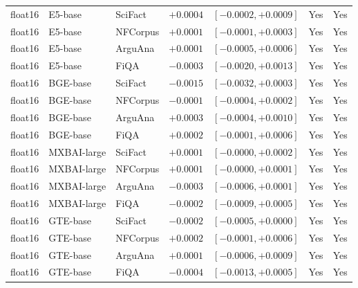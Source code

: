 \begin{table}[t]
\begin{tabular}{lllrrcc}
float16 & E5-base & SciFact & $+0.0004$ & $[-0.0002,+0.0009]$ & Yes & Yes \\
float16 & E5-base & NFCorpus & $+0.0001$ & $[-0.0001,+0.0003]$ & Yes & Yes \\
float16 & E5-base & ArguAna & $+0.0001$ & $[-0.0005,+0.0006]$ & Yes & Yes \\
float16 & E5-base & FiQA & $-0.0003$ & $[-0.0020,+0.0013]$ & Yes & Yes \\
float16 & BGE-base & SciFact & $-0.0015$ & $[-0.0032,+0.0003]$ & Yes & Yes \\
float16 & BGE-base & NFCorpus & $-0.0001$ & $[-0.0004,+0.0002]$ & Yes & Yes \\
float16 & BGE-base & ArguAna & $+0.0003$ & $[-0.0004,+0.0010]$ & Yes & Yes \\
float16 & BGE-base & FiQA & $+0.0002$ & $[-0.0001,+0.0006]$ & Yes & Yes \\
float16 & MXBAI-large & SciFact & $+0.0001$ & $[-0.0000,+0.0002]$ & Yes & Yes \\
float16 & MXBAI-large & NFCorpus & $+0.0001$ & $[-0.0000,+0.0001]$ & Yes & Yes \\
float16 & MXBAI-large & ArguAna & $-0.0003$ & $[-0.0006,+0.0001]$ & Yes & Yes \\
float16 & MXBAI-large & FiQA & $-0.0002$ & $[-0.0009,+0.0005]$ & Yes & Yes \\
float16 & GTE-base & SciFact & $-0.0002$ & $[-0.0005,+0.0000]$ & Yes & Yes \\
float16 & GTE-base & NFCorpus & $+0.0002$ & $[-0.0001,+0.0006]$ & Yes & Yes \\
float16 & GTE-base & ArguAna & $+0.0001$ & $[-0.0006,+0.0009]$ & Yes & Yes \\
float16 & GTE-base & FiQA & $-0.0004$ & $[-0.0013,+0.0005]$ & Yes & Yes \\
\bottomrule
\end{tabular}
\end{table}
